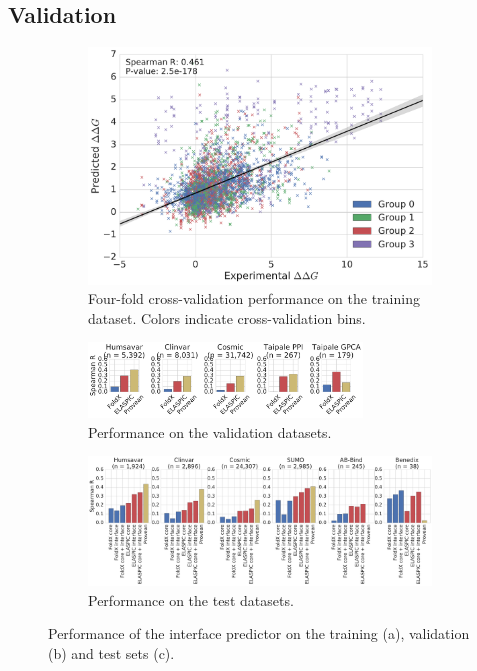 \subsection{Validation}

\begin{figure}[ht]

	\begin{subfigure}[b]{1.0\textwidth}
		\centering
		\includegraphics[width=0.6\linewidth]{static/elaspic_training_set/validation/crossvalidation_performance_interface.pdf}
		\caption{Four-fold cross-validation performance on the training dataset. Colors indicate cross-validation bins.}
		\vspace*{10mm}
	\end{subfigure}

	\begin{subfigure}[b]{1.0\textwidth}
		\centering
		\includegraphics[width=0.8\textwidth]{static/elaspic_training_set/validation/validation_performance_interface.pdf}
		\caption{Performance on the validation datasets.}
		\vspace*{10mm}
	\end{subfigure}

	\begin{subfigure}[b]{1.0\textwidth}
		\centering
		\includegraphics[width=1.0\textwidth]{static/elaspic_training_set/validation/test_performance_interface.pdf}
		\caption{Performance on the test datasets.}
	\end{subfigure}

	\caption{Performance of the interface predictor on the training (a), validation (b) and test sets (c).}
\end{figure}
